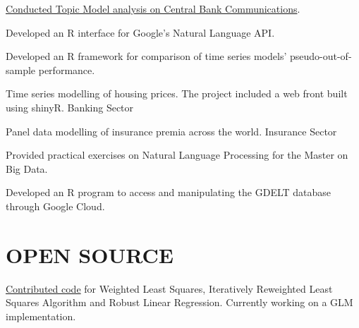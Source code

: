 \documentclass[]{deedy-resume-openfont}
\begin{document}
\begin{minipage}[t]{0.66\textwidth}
\begin{tightemize}
\item \href{
https://www.bbvaresearch.com/en/publicaciones/how-do-the-emerging-markets-central-bank-talk-a-big-data-approach-to-the-cb-of-turkey/
}
  {Conducted Topic Model analysis on Central Bank Communications}. 
\item Developed an R interface for Google's Natural Language API.
\item Developed an R framework for comparison of time series models' 
  pseudo-out-of-sample performance.
\end{tightemize}
\sectionsep

\begin{tightemize}
\item Time series modelling of housing prices. The project included a web front built using shinyR. Banking Sector
\item Panel data modelling of insurance premia across the world. Insurance Sector
\end{tightemize}
\sectionsep

Provided practical exercises on Natural Language Processing for 
the Master on Big Data.
\sectionsep

\begin{tightemize}
\item Developed an R program to access and manipulating the GDELT database through Google Cloud.
\end{tightemize} 



\section{OPEN SOURCE}
\location{}
\href{https://github.com/incanter/incanter/pull/396/files}{Contributed code} for Weighted Least Squares,
Iteratively Reweighted Least Squares Algorithm and Robust Linear Regression. Currently working on a GLM implementation.
\sectionsep

\end{minipage} 
\end{document}
